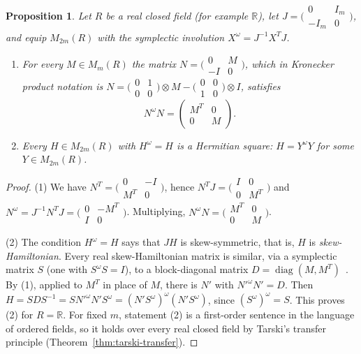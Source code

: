 \documentclass[12pt, a4paper]{report}
\theoremstyle{plain}
\newtheorem{proposition}[theorem]{Proposition}
\theoremstyle{definition}
\theoremstyle{remark}
\theoremstyle{plain}
\newcommand{\RR}{\mathbb{R}}
\DeclareMathOperator{\diag}{diag}
\begin{document}
\begin{proposition}\label{prop:symplectic-sqrt}
Let $R$ be a real closed field (for example $\RR$), let $J=\bigl(\begin{smallmatrix}0&I_m\\-I_m&0\end{smallmatrix}\bigr)$, and equip $M_{2m}(R)$ with the symplectic involution $X^\omega=J^{-1}X^TJ$.
\begin{enumerate}
  \item For every $M\in M_m(R)$ the matrix $N=\bigl(\begin{smallmatrix}0&M\\-I&0\end{smallmatrix}\bigr)$, which in Kronecker product notation is $N=\bigl(\begin{smallmatrix}0&1\\0&0\end{smallmatrix}\bigr)\otimes M-\bigl(\begin{smallmatrix}0&0\\1&0\end{smallmatrix}\bigr)\otimes I$, satisfies
  \[ N^\omega N=\begin{pmatrix}M^T&0\\0&M\end{pmatrix}. \]
  \item Every $H\in M_{2m}(R)$ with $H^\omega=H$ is a Hermitian square: $H=Y^\omega Y$ for some $Y\in M_{2m}(R)$.
\end{enumerate}
\end{proposition}
\begin{proof}
(1) We have $N^T=\bigl(\begin{smallmatrix}0&-I\\M^T&0\end{smallmatrix}\bigr)$, hence $N^TJ=\bigl(\begin{smallmatrix}I&0\\0&M^T\end{smallmatrix}\bigr)$ and $N^\omega=J^{-1}N^TJ=\bigl(\begin{smallmatrix}0&-M^T\\I&0\end{smallmatrix}\bigr)$. Multiplying, $N^\omega N=\bigl(\begin{smallmatrix}M^T&0\\0&M\end{smallmatrix}\bigr)$.

(2) The condition $H^\omega=H$ says that $JH$ is skew-symmetric, that is, $H$ is \emph{skew-Hamiltonian}. Every real skew-Hamiltonian matrix is similar, via a symplectic matrix $S$ (one with $S^\omega S=I$), to a block-diagonal matrix $D=\diag(M,M^T)$~\cite{FassbenderMackeyMackeyXu1999,VanLoan1984}. By (1), applied to $M^T$ in place of $M$, there is $N'$ with $N'^\omega N'=D$. Then $H=SDS^{-1}=SN'^\omega N'S^\omega=(N'S^\omega)^\omega(N'S^\omega)$, since $(S^\omega)^\omega=S$. This proves (2) for $R=\RR$. For fixed $m$, statement (2) is a first-order sentence in the language of ordered fields, so it holds over every real closed field by Tarski's transfer principle (Theorem~\ref{thm:tarski-transfer}).
\end{proof}
\end{document}
